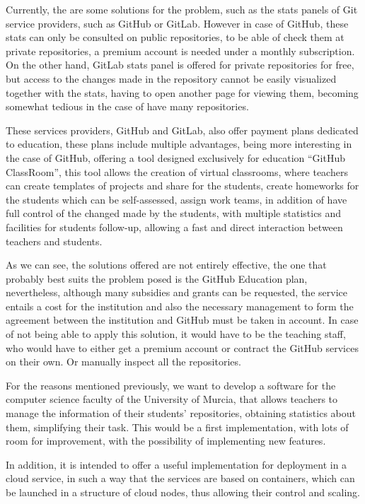 Currently, the are some solutions for the problem, such as the stats panels
of Git service providers, such as GitHub or GitLab. However in case of
GitHub, these stats can only be consulted on public repositories, to be
able of check them at private repositories, a premium account is needed
under a monthly subscription. On the other hand, GitLab stats panel is
offered for private repositories for free, but access to the changes made
in the repository cannot be easily visualized together with the stats,
having to open another page for viewing them, becoming somewhat tedious in
the case of have many repositories.

These services providers, GitHub and GitLab, also offer payment plans
dedicated to education, these plans include multiple advantages, being more
interesting in the case of GitHub, offering a tool designed exclusively for
education “GitHub ClassRoom”, this tool allows the creation of virtual
classrooms, where teachers can create templates of projects and share for
the students, create homeworks for the students which can be self-assessed,
assign work teams, in addition of have full control of the changed made by
the students, with multiple statistics and facilities for students
follow-up, allowing a fast and direct interaction between teachers and
students.

As we can see, the solutions offered are not entirely effective, the one
that probably best suits the problem posed is the GitHub Education plan,
nevertheless, although many subsidies and grants can be requested, the
service entails a cost for the institution and also the necessary
management to form the agreement between the institution and GitHub must be
taken in account. In case of not being able to apply this solution, it
would have to be the teaching staff, who would have to either get a premium
account or contract the GitHub services on their own. Or manually inspect
all the repositories.

For the reasons mentioned previously, we want to develop a software for the
computer science faculty of the University of Murcia, that allows teachers
to manage the information of their students' repositories, obtaining
statistics about them, simplifying their task. This would be a first
implementation, with lots of room for improvement, with the possibility of
implementing new features.

In addition, it is intended to offer a useful implementation for deployment
in a cloud service, in such a way that the services are based on
containers, which can be launched in a structure of cloud nodes, thus
allowing their control and scaling.

